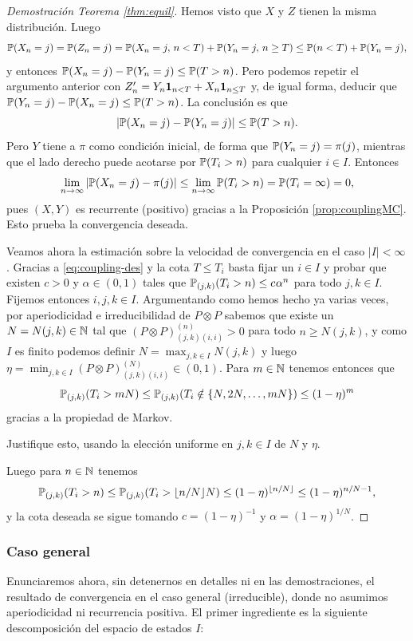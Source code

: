 \begin{proof}[Demostración Teorema \ref{thm:equil}]
Hemos visto que  $X$ y $Z$ tienen la misma distribución.
Luego
\[\mathbb{P}(X_n=j)=\mathbb{P}(Z_n=j)=\mathbb{P}(X_n=j,\,n<T)+\mathbb{P}(Y_n=j,\,n\geq T)\leq\mathbb{P}(n<T)+\mathbb{P}(Y_n=j),\]
y entonces $\mathbb{P}(X_n=j)-\mathbb{P}(Y_n=j)\leq\mathbb{P}(T>n)$.
Pero podemos repetir el argumento anterior con $Z_n'=Y_n\mathbf{1}_{n<T}+X_n\mathbf{1}_{n\leq T}$ y, de igual forma, deducir que $\mathbb{P}(Y_n=j)-\mathbb{P}(X_n=j)\leq\mathbb{P}(T>n)$.
La conclusión es que
\begin{equation}
\left|\mathbb{P}(X_n=j)-\mathbb{P}(Y_n=j)\right|\leq\mathbb{P}(T>n).\label{eq:coupling-des}
\end{equation}
Pero $Y$ tiene a $\pi$ como condición inicial, de forma que $\mathbb{P}(Y_n=j)=\pi(j)$, mientras que el lado derecho puede acotarse por $\mathbb{P}(T_i>n)$ para cualquier $i\in I$.
Entonces
\[\lim_{n\to\infty}\left|\mathbb{P}(X_n=j)-\pi(j)\right|\leq\lim_{n\to\infty}\mathbb{P}(T_i>n)=\mathbb{P}(T_i=\infty)=0,\]
pues $(X,Y)$ es recurrente (positivo) gracias a la Proposición \ref{prop:couplingMC}.
Esto prueba la convergencia deseada.

Veamos ahora la estimación sobre la velocidad de convergencia en el caso $|I|<\infty$.
Gracias a \eqref{eq:coupling-des} y la cota $T\leq T_i$ basta fijar un $i\in I$ y probar que existen $c>0$ y $\alpha\in(0,1)$ tales que $\mathbb{P}_{(j,k)}(T_i>n)\leq c\hspace{0.05em}\alpha^n$ para todo $j,k\in I$.
Fijemos entonces $i,j,k\in I$.
Argumentando como hemos hecho ya varias veces, por aperiodicidad e irreducibilidad de $P\otimes P$ sabemos que existe un $N=N(j,k)\in\mathbb{N}$ tal que $(P\otimes P)^{(n)}_{(j,k)(i,i)}>0$ para todo $n\geq N(j,k)$, y como $I$ es finito podemos definir $N=\max_{j,k\in I}N(j,k)$ y luego $\eta=\min_{j,k\in I}(P\otimes P)^{(N)}_{(j,k)(i,i)}\in(0,1)$.
Para $m\in\mathbb{N}$ tenemos entonces que
\[\mathbb{P}_{(j,k)}(T_i>mN)\leq\mathbb{P}_{(j,k)}(T_i\notin\{N,2N,\dotsc,mN\})\leq(1-\eta)^m\]
gracias a la propiedad de Markov.
\begin{exer}
Justifique esto, usando la elección uniforme en $j,k\in I$ de $N$ y $\eta$.
\end{exer}
\noindent Luego para $n\in\mathbb{N}$ tenemos
\[\mathbb{P}_{(j,k)}(T_i>n)\leq\mathbb{P}_{(j,k)}(T_i>\lfloor n/N\rfloor N)\leq(1-\eta)^{\lfloor n/N\rfloor}\leq(1-\eta)^{n/N-1},\]
y la cota deseada se sigue tomando $c=(1-\eta)^{-1}$ y $\alpha=(1-\eta)^{1/N}$.
\end{proof}

\subsubsection{Caso general}

Enunciaremos ahora, sin detenernos en detalles ni en las demostraciones, el resultado de convergencia en el caso general (irreducible), donde no asumimos aperiodicidad ni recurrencia positiva.
El primer ingrediente es la siguiente descomposición del espacio de estados $I$:

